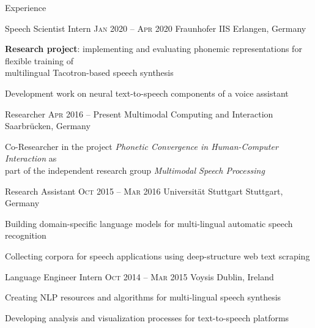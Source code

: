 \documentclass{resume} %
\begin{document}
\begin{rSection}{Experience}

\begin{rSubsection}
	{Speech Scientist Intern}
	{\textsc{Jan} 2020 -- \textsc{Apr} 2020}
	{Fraunhofer IIS}
	{Erlangen, Germany}
	
	\setlength{\itemindent}{.7cm}
	
	\item \textbf{Research project}: implementing and evaluating phonemic representations for flexible training of\\\hspace*{4.1cm} multilingual Tacotron-based speech synthesis
	\item Development work on neural text-to-speech components of a voice assistant
\end{rSubsection}

\begin{rSubsection}
	{Researcher}
	{\textsc{Apr} 2016 -- Present}
	{Multimodal Computing and Interaction}
	{Saarbrücken, Germany}
	
	\setlength{\itemindent}{.7cm}
	
	\item Co-Researcher in the project \textit{Phonetic Convergence in Human-Computer Interaction} as\\\hspace*{.7cm}part of the independent research group \textit{Multimodal Speech Processing}
\end{rSubsection}

\begin{rSubsection}
	{Research Assistant}
	{\textsc{Oct} 2015 -- \textsc{Mar} 2016}
	{Universität Stuttgart}
	{Stuttgart, Germany}
	
	\setlength{\itemindent}{.7cm}
	
	\item Building domain-specific language models for multi-lingual automatic speech recognition
	\item Collecting corpora for speech applications using deep-structure web text scraping
\end{rSubsection}

\begin{rSubsection}
	{Language Engineer Intern}
	{\textsc{Oct} 2014 -- \textsc{Mar} 2015}
	{Voysis}
	{Dublin, Ireland}
	
	\setlength{\itemindent}{.7cm}

	\item Creating NLP resources and algorithms for multi-lingual speech synthesis
	\item Developing analysis and visualization processes for text-to-speech platforms
\end{rSubsection}


\end{rSection}
\end{document}
